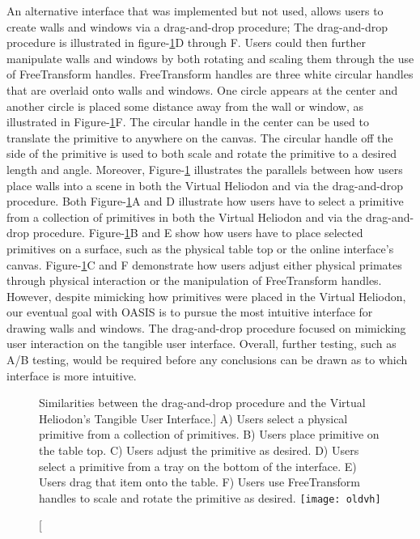 An alternative interface that was implemented but not used, allows users to create walls and windows via a drag-and-drop procedure;
The drag-and-drop procedure is illustrated in figure-\ref{fig:oldvh}D through F.
Users could then further manipulate walls and windows by both rotating and scaling them through the use of FreeTransform handles. 
FreeTransform handles are three white circular handles that are overlaid onto walls and windows.
One circle appears at the center and another circle is placed some distance away from the wall or window, as illustrated in Figure-\ref{fig:oldvh}F.
The circular handle in the center can be used to translate the primitive to anywhere on the canvas.
The circular handle off the side of the primitive is used to both scale and rotate the primitive to a desired length and angle.
Moreover, Figure-\ref{fig:oldvh} illustrates the parallels between how users place walls  into a scene in both the Virtual Heliodon and via the drag-and-drop procedure.
Both Figure-\ref{fig:oldvh}A and D illustrate how users have to select a primitive from a collection of primitives in both the Virtual Heliodon and via the drag-and-drop procedure.
Figure-\ref{fig:oldvh}B and E show how users have to place selected primitives on a surface, such as the physical table top or the online interface's canvas.
Figure-\ref{fig:oldvh}C and F demonstrate how users adjust either physical primates through physical interaction or the manipulation of FreeTransform handles.
However, despite mimicking how primitives were placed in the Virtual Heliodon, our eventual goal with OASIS is to pursue the most intuitive interface for drawing walls and windows.
The  drag-and-drop procedure focused on mimicking user interaction on the tangible user interface.
Overall, further testing, such as A/B testing, would be required before any conclusions can be drawn as to which interface is more intuitive.\\

\begin{figure}[!ht]
\centering
\caption
[Similarities between the drag-and-drop procedure and the Virtual Heliodon's Tangible User Interface.]{
 A) Users select a physical primitive from a collection of primitives. 
 B) Users place primitive on the table top. 
 C) Users adjust the primitive as desired. 
 D) Users select a primitive from a tray on the bottom of the interface. 
 E) Users drag that item onto the table. 
 F) Users use FreeTransform handles to scale and rotate the primitive as desired.
}
\label{fig:oldvh}
\texttt{[image: oldvh]}
\end{figure}

